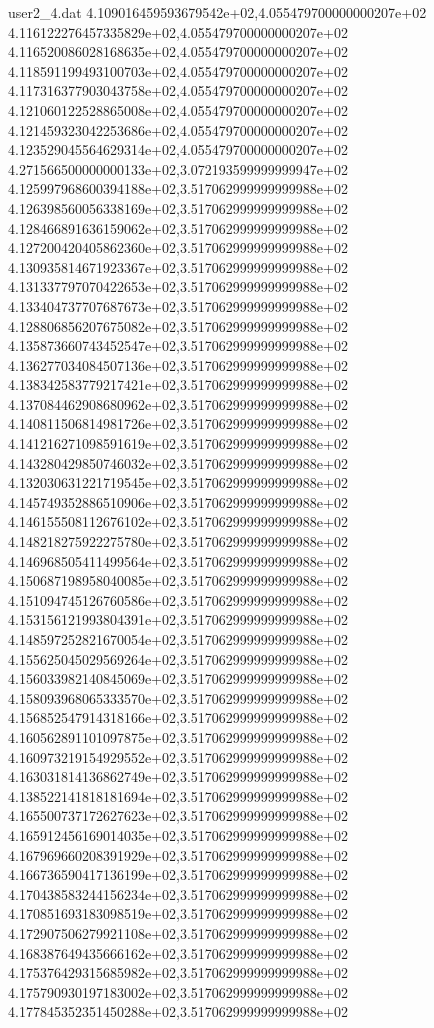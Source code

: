 \begin{filecontents}{user2_4.dat}
4.109016459593679542e+02,4.055479700000000207e+02
4.116122276457335829e+02,4.055479700000000207e+02
4.116520086028168635e+02,4.055479700000000207e+02
4.118591199493100703e+02,4.055479700000000207e+02
4.117316377903043758e+02,4.055479700000000207e+02
4.121060122528865008e+02,4.055479700000000207e+02
4.121459323042253686e+02,4.055479700000000207e+02
4.123529045564629314e+02,4.055479700000000207e+02
4.271566500000000133e+02,3.072193599999999947e+02
4.125997968600394188e+02,3.517062999999999988e+02
4.126398560056338169e+02,3.517062999999999988e+02
4.128466891636159062e+02,3.517062999999999988e+02
4.127200420405862360e+02,3.517062999999999988e+02
4.130935814671923367e+02,3.517062999999999988e+02
4.131337797070422653e+02,3.517062999999999988e+02
4.133404737707687673e+02,3.517062999999999988e+02
4.128806856207675082e+02,3.517062999999999988e+02
4.135873660743452547e+02,3.517062999999999988e+02
4.136277034084507136e+02,3.517062999999999988e+02
4.138342583779217421e+02,3.517062999999999988e+02
4.137084462908680962e+02,3.517062999999999988e+02
4.140811506814981726e+02,3.517062999999999988e+02
4.141216271098591619e+02,3.517062999999999988e+02
4.143280429850746032e+02,3.517062999999999988e+02
4.132030631221719545e+02,3.517062999999999988e+02
4.145749352886510906e+02,3.517062999999999988e+02
4.146155508112676102e+02,3.517062999999999988e+02
4.148218275922275780e+02,3.517062999999999988e+02
4.146968505411499564e+02,3.517062999999999988e+02
4.150687198958040085e+02,3.517062999999999988e+02
4.151094745126760586e+02,3.517062999999999988e+02
4.153156121993804391e+02,3.517062999999999988e+02
4.148597252821670054e+02,3.517062999999999988e+02
4.155625045029569264e+02,3.517062999999999988e+02
4.156033982140845069e+02,3.517062999999999988e+02
4.158093968065333570e+02,3.517062999999999988e+02
4.156852547914318166e+02,3.517062999999999988e+02
4.160562891101097875e+02,3.517062999999999988e+02
4.160973219154929552e+02,3.517062999999999988e+02
4.163031814136862749e+02,3.517062999999999988e+02
4.138522141818181694e+02,3.517062999999999988e+02
4.165500737172627623e+02,3.517062999999999988e+02
4.165912456169014035e+02,3.517062999999999988e+02
4.167969660208391929e+02,3.517062999999999988e+02
4.166736590417136199e+02,3.517062999999999988e+02
4.170438583244156234e+02,3.517062999999999988e+02
4.170851693183098519e+02,3.517062999999999988e+02
4.172907506279921108e+02,3.517062999999999988e+02
4.168387649435666162e+02,3.517062999999999988e+02
4.175376429315685982e+02,3.517062999999999988e+02
4.175790930197183002e+02,3.517062999999999988e+02
4.177845352351450288e+02,3.517062999999999988e+02

\end{filecontents}
